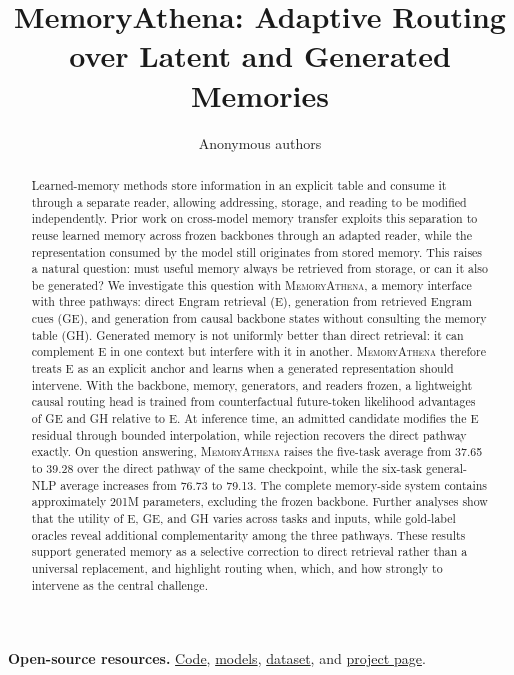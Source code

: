 \documentclass{article}
\title{MemoryAthena: Adaptive Routing over Latent and Generated Memories}
\author{Anonymous authors}
\date{}
\newcommand{\method}{\textsc{MemoryAthena}}
\begin{document}
\maketitle
\begin{abstract}
Learned-memory methods store information in an explicit table and consume it through a separate reader, allowing addressing, storage, and reading to be modified independently. Prior work on cross-model memory transfer exploits this separation to reuse learned memory across frozen backbones through an adapted reader, while the representation consumed by the model still originates from stored memory. This raises a natural question: must useful memory always be
retrieved from storage, or can it also be generated?
%
We investigate this question with \textsc{MemoryAthena}, a memory interface with three pathways: direct Engram retrieval (E), generation from retrieved Engram cues (GE), and generation from causal backbone states without consulting the memory table (GH). Generated memory is not uniformly better than direct retrieval: it can complement E in one context but interfere with it in another.
\textsc{MemoryAthena} therefore treats E as an explicit anchor and learns when a generated representation should intervene. With the backbone, memory, generators, and readers frozen, a lightweight causal routing head is trained from counterfactual future-token likelihood advantages of GE and GH relative to E. At inference time, an admitted candidate modifies the E residual through bounded interpolation, while rejection recovers the direct pathway exactly.
%
On question answering, \method{} raises the five-task average from 37.65 to 39.28 over the direct pathway of the same checkpoint, while the six-task general-NLP average increases from 76.73 to 79.13. The complete memory-side system contains approximately 201M parameters, excluding the frozen backbone. Further analyses show that the utility of E, GE, and GH varies across tasks and inputs, while gold-label oracles reveal additional complementarity among the three pathways. These results support generated memory as a selective correction to direct retrieval rather than a universal replacement, and highlight routing when, which, and how strongly to intervene as the central
challenge.
\end{abstract}
\noindent\textbf{Open-source resources.}
\href{https://github.com/MJLee00/ATHENA}{Code},
\href{https://huggingface.co/collections/OLAResearchX/memoryathena}{models},
\href{https://huggingface.co/datasets/OLAResearchX/MemoryATHENA}{dataset}, and
\href{https://github.com/MJLee00/ATHENA/tree/main/web}{project page}.
\medskip
\end{document}

